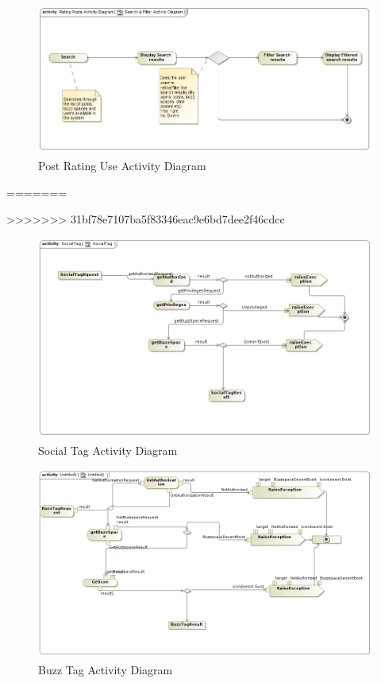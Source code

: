 \documentclass[11pt]{article}
\begin{document}
	\graphicspath{ {../Diagrams/Sphe/PostRatings/} }
	  \begin{figure}[H]	
    	\includegraphics[scale=0.65]{ActivityDiagram.jpg}
    	\caption{Post Rating Use Activity Diagram}
	\end{figure}
	
=======

>>>>>>> 31bf78e7107ba5f83346eac9e6bd7dee2f46cdcc
	\begin{figure}[H]	
\graphicspath{ {../Diagrams/sfiso/} }
    	\includegraphics[scale=0.5]{socialA.jpg}
    	\caption{Social Tag  Activity Diagram}
	\end{figure}
	\begin{figure}[H]	
\graphicspath{ {../Diagrams/sfiso/} }
    	\includegraphics[scale=0.5]{buzzA.jpg}
    	\caption{Buzz Tag  Activity Diagram}
	\end{figure}
\end{document}
